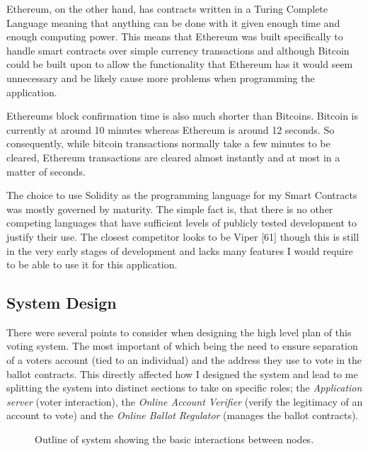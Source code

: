 \documentclass{article}
\begin{document}
Ethereum, on the other hand, has contracts written in a Turing Complete Language meaning that anything can be done with it given enough time and enough computing power. This means that Ethereum was built specifically to handle smart contracts over simple currency transactions and although Bitcoin could be built upon to allow the functionality that Ethereum has it would seem unnecessary and be likely cause more problems when programming the application.

Ethereums block confirmation time is also much shorter than Bitcoins. Bitcoin is currently at around 10 minutes whereas Ethereum is around 12 seconds. So consequently, while bitcoin transactions normally take a few minutes to be cleared, Ethereum transactions are cleared almost instantly and at most in a matter of seconds.

The choice to use Solidity as the programming language for my Smart Contracts was mostly governed by maturity. The simple fact is, that there is no other competing languages that have sufficient levels of publicly tested development to justify their use. The closest competitor looks to be Viper {\Large [61]} though this is still in the very early stages of development and lacks many features I would require to be able to use it for this application.
	

\cleardoublepage
\subsection{System Design}

There were several points to consider when designing the high level plan of this voting system. The most important of which being the need to ensure separation of a voters account (tied to an individual) and the address they use to vote in the ballot contracts. This directly affected how I designed the system and lead to me splitting the system into distinct sections to take on specific roles; the \textit{Application server} (voter interaction), the \textit{Online Account Verifier} (verify the legitimacy of an account to vote) and the \textit{Online Ballot Regulator} (manages the ballot contracts).

\begin{figure}[h]
	\noindent
	\caption{Outline of system showing the basic interactions between nodes.}
\end{figure}
\end{document}
